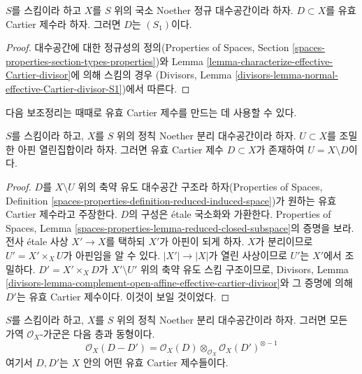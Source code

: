 \begin{lemma}
\label{lemma-normal-effective-Cartier-divisor-S1}
$S$를 스킴이라 하고 $X$를 $S$ 위의 국소 Noether 정규 대수공간이라 하자.
$D \subset X$를 유효 Cartier 제수라 하자. 그러면 $D$는 $(S_1)$이다.
\end{lemma}

\begin{proof}
대수공간에 대한 정규성의 정의(Properties of Spaces, Section
\ref{spaces-properties-section-types-properties})와 Lemma
\ref{lemma-characterize-effective-Cartier-divisor}에 의해 스킴의 경우
(Divisors, Lemma
\ref{divisors-lemma-normal-effective-Cartier-divisor-S1})에서 따른다.
\end{proof}

\noindent
다음 보조정리는 때때로 유효 Cartier 제수를 만드는 데 사용할 수 있다.

\begin{lemma}
\label{lemma-complement-open-affine-effective-cartier-divisor}
$S$를 스킴이라 하고, $X$를 $S$ 위의 정칙 Noether 분리 대수공간이라 하자.
$U \subset X$를 조밀한 아핀 열린집합이라 하자. 그러면 유효 Cartier 제수
$D \subset X$가 존재하여 $U = X \setminus D$이다.
\end{lemma}

\begin{proof}
$D$를 $X \setminus U$ 위의 축약 유도 대수공간 구조라 하자(Properties of Spaces,
Definition \ref{spaces-properties-definition-reduced-induced-space})가 원하는
유효 Cartier 제수라고 주장한다. $D$의 구성은 \'etale 국소화와 가환한다.
Properties of Spaces, Lemma
\ref{spaces-properties-lemma-reduced-closed-subspace}의 증명을 보라.
전사 \'etale 사상 $X' \to X$를 택하되 $X'$가 아핀이 되게 하자.
$X$가 분리이므로 $U' = X' \times_X U$가 아핀임을 알 수 있다.
$|X'| \to |X|$가 열린 사상이므로 $U'$는 $X'$에서 조밀하다.
$D' = X' \times_X D$가 $X' \setminus U'$ 위의 축약 유도 스킴 구조이므로,
Divisors, Lemma
\ref{divisors-lemma-complement-open-affine-effective-cartier-divisor}와 그
증명에 의해 $D'$는 유효 Cartier 제수이다. 이것이 보일 것이었다.
\end{proof}

\begin{lemma}
\label{lemma-Noetherian-regular-separated-pic-effective-Cartier}
$S$를 스킴이라 하고, $X$를 $S$ 위의 정칙 Noether 분리 대수공간이라 하자.
그러면 모든 가역 $\mathcal{O}_X$-가군은 다음 층과 동형이다.
$$
\mathcal{O}_X(D - D') =
\mathcal{O}_X(D) \otimes_{\mathcal{O}_X} \mathcal{O}_X(D')^{\otimes -1}
$$
여기서 $D, D'$는 $X$ 안의 어떤 유효 Cartier 제수들이다.
\end{lemma}

